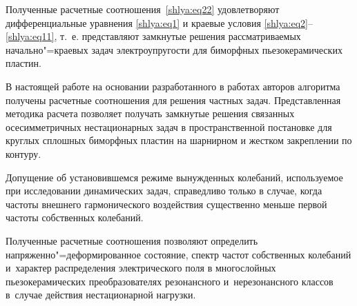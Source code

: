 Полученные расчетные соотношения~\eqref{shlya:eq22} удовлетворяют дифференциальные 
уравнения \eqref{shlya:eq1} и краевые условия \eqref{shlya:eq2}--\eqref{shlya:eq11}, 
т.~е. представляют замкнутые решения рассматриваемых начально"=краевых задач электроупругости для 
биморфных пьезокерамических пластин.

\smallskip

 В настоящей работе на основании разработанного в работах авторов \cite{shlya:bib18,shlya:bib21,shlya:bib22} алгоритма получены расчетные соотношения для решения частных задач. 
Представленная методика расчета позволяет получать замкнутые решения связанных осесимметричных нестационарных задач в пространственной постановке для круглых сплошных биморфных пластин на шарнирном и жестком закреплении по контуру.

Допущение об установившемся режиме вынужденных колебаний, используемое при 
исследовании динамических задач, справедливо только в случае, когда частоты 
внешнего гармонического воздействия существенно меньше первой частоты 
собственных колебаний.

Полученные расчетные соотношения позволяют определить 
напряженно"=деформированное состояние, спектр частот собственных колебаний и~характер распределения электрического поля в многослойных пьезокерамических  преобразователях резонансного и~нерезонансного классов в~случае действия 
нестационарной нагрузки.

%
%
%
%


